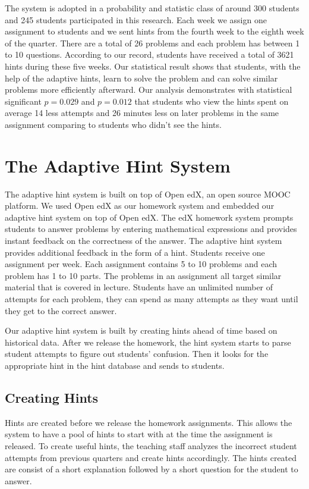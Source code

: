 \documentclass{llncs}
\begin{document}
The system is adopted in a probability and statistic class of around 300 students and 245 students participated in this research. Each week we assign one assignment to students and we sent hints from the fourth week to the eighth week of the quarter. There are a total of 26 problems and each problem has between 1 to 10 questions. According to our record, students have received a total of 3621 hints during these five weeks. Our statistical result shows that students, with the help of the adaptive hints, learn to solve the problem and can solve similar problems more efficiently afterward. Our analysis demonstrates with statistical significant $p=0.029$ and $p=0.012$ that students who view the hints spent on average 14 less attempts and 26 minutes less on later problems in the same assignment comparing to students who didn't see the hints.


\section{The Adaptive Hint System}
The adaptive hint system is built on top of Open edX, an open source MOOC platform. We used Open edX as our homework system and embedded our adaptive hint system on top of Open edX. The edX homework system prompts students to answer problems by entering mathematical expressions and provides instant feedback on the correctness of the answer. The adaptive hint system provides additional feedback in the form of a hint. Students receive one assignment per week. Each assignment contains 5 to 10 problems and each problem has 1 to 10 parts. The problems in an assignment all target similar material that is covered in lecture. Students have an unlimited number of attempts for each problem, they can spend as many attempts as they want until they get to the correct answer.

Our adaptive hint system is built by creating hints ahead of time based on historical data. After we release the homework, the hint system starts to parse student attempts to figure out students' confusion. Then it looks for the appropriate hint in the hint database and sends to students.

\subsection*{Creating Hints}

Hints are created before we release the homework assignments. This allows the system to have a pool of hints to start with at the time the assignment is released. To create useful hints, the teaching staff analyzes the incorrect student attempts from previous quarters and create hints accordingly. The hints created are consist of a short explanation followed by a short question for the student to answer.
\end{document}

